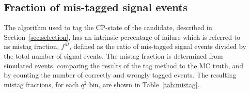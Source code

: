 \subsection{Fraction of mis-tagged signal events}
\label{sec:mistag}


The algorithm used to tag the CP-state of the \PBz candidate, described in Section~\ref{sec:selection}, has an intrinsic percentage of failure which is referred to as mistag fraction, $f^M$, defined as the ratio of mis-tagged signal events divided by the total number of signal events.
The mistag fraction is determined from simulated events, comparing the results of the tag method to the MC truth, and by counting the number of correctly and wrongly tagged events.
The resulting mistag fractions, for each $q^2$ bin, are shown in Table~\ref{tab:mistag}.

